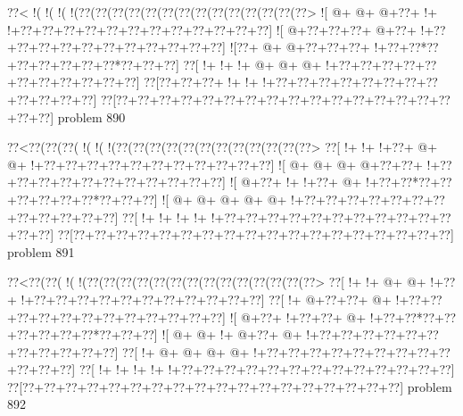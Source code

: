 \vbox{\vbox{\goo
\0??<\- !(\- !(\- !(\- !(\0??(\0??(\0??(\0??(\0??(\0??(\0??(\0??(\0??(\0??(\0??(\0??(\0??(\0??>
\- ![\- @+\- @+\- @+\0??+\- !+\- !+\0??+\0??+\0??+\0??+\0??+\0??+\0??+\0??+\0??+\0??+\0??+\0??]
\- ![\- @+\0??+\0??+\0??+\- @+\0??+\- !+\0??+\0??+\0??+\0??+\0??+\0??+\0??+\0??+\0??+\0??+\0??]
\- ![\0??+\- @+\- @+\0??+\0??+\0??+\- !+\0??+\0??*\0??+\0??+\0??+\0??+\0??+\0??*\0??+\0??+\0??]
\0??[\- !+\- !+\- !+\- @+\- @+\- @+\- !+\0??+\0??+\0??+\0??+\0??+\0??+\0??+\0??+\0??+\0??+\0??]
\0??[\0??+\0??+\0??+\- !+\- !+\- !+\0??+\0??+\0??+\0??+\0??+\0??+\0??+\0??+\0??+\0??+\0??+\0??]
\0??[\0??+\0??+\0??+\0??+\0??+\0??+\0??+\0??+\0??+\0??+\0??+\0??+\0??+\0??+\0??+\0??+\0??+\0??]
}
\hfil problem 890\hfil\break
}



\vbox{\vbox{\goo
\0??<\0??(\0??(\0??(\- !(\- !(\- !(\0??(\0??(\0??(\0??(\0??(\0??(\0??(\0??(\0??(\0??(\0??(\0??>
\0??[\- !+\- !+\- !+\0??+\- @+\- @+\- !+\0??+\0??+\0??+\0??+\0??+\0??+\0??+\0??+\0??+\0??+\0??]
\- ![\- @+\- @+\- @+\- @+\0??+\0??+\- !+\0??+\0??+\0??+\0??+\0??+\0??+\0??+\0??+\0??+\0??+\0??]
\- ![\- @+\0??+\- !+\- !+\0??+\- @+\- !+\0??+\0??*\0??+\0??+\0??+\0??+\0??+\0??*\0??+\0??+\0??]
\- ![\- @+\- @+\- @+\- @+\- @+\- !+\0??+\0??+\0??+\0??+\0??+\0??+\0??+\0??+\0??+\0??+\0??+\0??]
\0??[\- !+\- !+\- !+\- !+\- !+\0??+\0??+\0??+\0??+\0??+\0??+\0??+\0??+\0??+\0??+\0??+\0??+\0??]
\0??[\0??+\0??+\0??+\0??+\0??+\0??+\0??+\0??+\0??+\0??+\0??+\0??+\0??+\0??+\0??+\0??+\0??+\0??]
}
\hfil problem 891\hfil\break
}



\vbox{\vbox{\goo
\0??<\0??(\0??(\- !(\- !(\0??(\0??(\0??(\0??(\0??(\0??(\0??(\0??(\0??(\0??(\0??(\0??(\0??(\0??>
\0??[\- !+\- !+\- @+\- @+\- !+\0??+\- !+\0??+\0??+\0??+\0??+\0??+\0??+\0??+\0??+\0??+\0??+\0??]
\0??[\- !+\- @+\0??+\0??+\- @+\- !+\0??+\0??+\0??+\0??+\0??+\0??+\0??+\0??+\0??+\0??+\0??+\0??]
\- ![\- @+\0??+\- !+\0??+\0??+\- @+\- !+\0??+\0??*\0??+\0??+\0??+\0??+\0??+\0??*\0??+\0??+\0??]
\- ![\- @+\- @+\- !+\- @+\0??+\- @+\- !+\0??+\0??+\0??+\0??+\0??+\0??+\0??+\0??+\0??+\0??+\0??]
\0??[\- !+\- @+\- @+\- @+\- @+\- !+\0??+\0??+\0??+\0??+\0??+\0??+\0??+\0??+\0??+\0??+\0??+\0??]
\0??[\- !+\- !+\- !+\- !+\- !+\0??+\0??+\0??+\0??+\0??+\0??+\0??+\0??+\0??+\0??+\0??+\0??+\0??]
\0??[\0??+\0??+\0??+\0??+\0??+\0??+\0??+\0??+\0??+\0??+\0??+\0??+\0??+\0??+\0??+\0??+\0??+\0??]
}
\hfil problem 892\hfil\break
}



